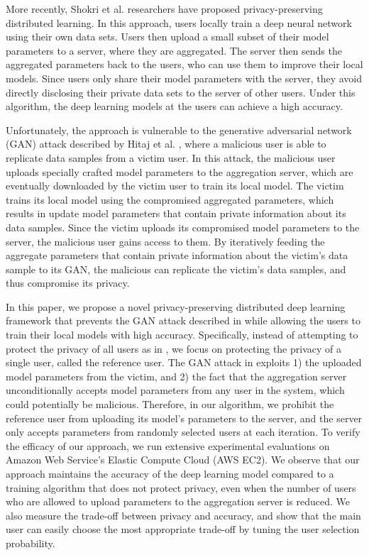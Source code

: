 \documentclass[conference]{IEEEtran}
\begin{document}
More recently,  Shokri et al.  \cite{shokri2015privacy} researchers have proposed privacy-preserving distributed learning. In this
approach, users locally train a deep neural network using their own data sets. Users then upload a small subset of their model
parameters to a server, where they  are aggregated. The server then sends the aggregated parameters back to the users, who can use
them to improve their local models. Since users only share their model parameters with the server, they avoid directly disclosing their
private data sets to the server of other users. Under this algorithm, the deep learning models at the users can achieve a high
accuracy. 

Unfortunately,  the approach \cite{shokri2015privacy} is vulnerable to the generative adversarial network (GAN) attack described by 
Hitaj  et al. \cite{hitaj2017deep}, where  a malicious user is able to replicate data samples from a victim user. In this attack, 
the malicious user uploads specially crafted model parameters to the aggregation server, which are eventually downloaded by the victim
user to train its local model. The victim trains its local model using the compromised aggregated parameters, which results in
update model parameters that contain private information about its data samples. Since the victim uploads its compromised model
parameters to the server, the malicious user gains access to them. By iteratively feeding the aggregate parameters that contain private
information about the victim's data sample to its GAN, the malicious can replicate the victim's data samples, and thus compromise its
privacy.

In this paper, we propose a novel privacy-preserving distributed deep learning framework that prevents the GAN attack described in 
\cite{hitaj2017deep} while allowing the users to train their local models with high accuracy. 
Specifically, instead of attempting to protect the privacy of all users as in \cite{shokri2015privacy}, we focus on protecting the
privacy of a single user, called the reference user. The GAN attack in \cite{hitaj2017deep} exploits 1) the uploaded
model parameters from the victim, and 2) the fact that the  aggregation server unconditionally accepts model parameters from any user
in the system, which could potentially be malicious. Therefore, in our algorithm, we prohibit the reference user from uploading its
model's parameters to the server, and the server only accepts parameters from randomly selected users at each iteration. 
To verify the efficacy of our approach, we run extensive experimental evaluations on Amazon Web Service's Elastic
Compute Cloud (AWS EC2). We observe that our approach maintains the accuracy of the deep learning model compared to a training
algorithm that does not protect privacy, even when the number of users who are allowed to upload parameters to the aggregation
server is reduced. We also measure the trade-off between privacy and accuracy, and show that the main user can easily choose the most
appropriate trade-off by tuning the user selection probability. 
\end{document}
